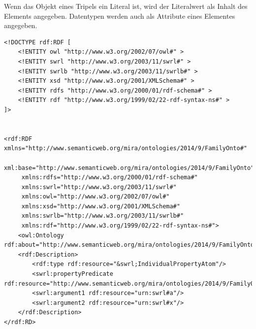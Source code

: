 Wenn das Objekt eines Tripels ein Literal ist, wird der Literalwert als Inhalt des Elements angegeben. Datentypen werden auch als Attribute eines Elementes angegeben.

\begin{lstlisting}[caption={Beispiel RDF Elemente\protect\footnotemark}]
<!DOCTYPE rdf:RDF [
    <!ENTITY owl "http://www.w3.org/2002/07/owl#" >
    <!ENTITY swrl "http://www.w3.org/2003/11/swrl#" >
    <!ENTITY swrlb "http://www.w3.org/2003/11/swrlb#" >
    <!ENTITY xsd "http://www.w3.org/2001/XMLSchema#" >
    <!ENTITY rdfs "http://www.w3.org/2000/01/rdf-schema#" >
    <!ENTITY rdf "http://www.w3.org/1999/02/22-rdf-syntax-ns#" >
]>


<rdf:RDF xmlns="http://www.semanticweb.org/mira/ontologies/2014/9/FamilyOnto#"
     xml:base="http://www.semanticweb.org/mira/ontologies/2014/9/FamilyOnto"
     xmlns:rdfs="http://www.w3.org/2000/01/rdf-schema#"
     xmlns:swrl="http://www.w3.org/2003/11/swrl#"
     xmlns:owl="http://www.w3.org/2002/07/owl#"
     xmlns:xsd="http://www.w3.org/2001/XMLSchema#"
     xmlns:swrlb="http://www.w3.org/2003/11/swrlb#"
     xmlns:rdf="http://www.w3.org/1999/02/22-rdf-syntax-ns#">
    <owl:Ontology rdf:about="http://www.semanticweb.org/mira/ontologies/2014/9/FamilyOnto"/>
    <rdf:Description>
        <rdf:type rdf:resource="&swrl;IndividualPropertyAtom"/>
        <swrl:propertyPredicate rdf:resource="http://www.semanticweb.org/mira/ontologies/2014/9/FamilyOnto#isAncestor"/>
        <swrl:argument1 rdf:resource="urn:swrl#a"/>
        <swrl:argument2 rdf:resource="urn:swrl#x"/>
    </rdf:Description>
</rdf:RD>
\end{lstlisting}
